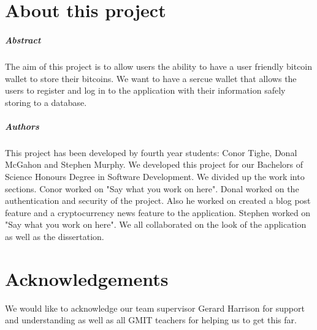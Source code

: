 
\chapter*{About this project}
\paragraph{Abstract}
The aim of this project is to allow users the ability to have a user friendly bitcoin wallet to store their bitcoins. We want to have a sercue wallet that allows the users to register and log in to the application with their information safely storing to a database. 

\paragraph{Authors}
This project has been developed by fourth year students: Conor Tighe, Donal McGahon and Stephen Murphy. We developed this project for our Bachelors of Science Honours Degree in Software Development. We divided up the work into sections. Conor worked on "Say what you work on here". Donal worked on the authentication and security of the project. Also he worked on created a blog post feature and a cryptocurrency news feature to the application. Stephen worked on "Say what you work on here". We all collaborated on the look of the application as well as the dissertation.

\chapter*{Acknowledgements}
We would like to acknowledge our team supervisor Gerard Harrison for support and understanding as well as all GMIT teachers for helping us to get this far.


